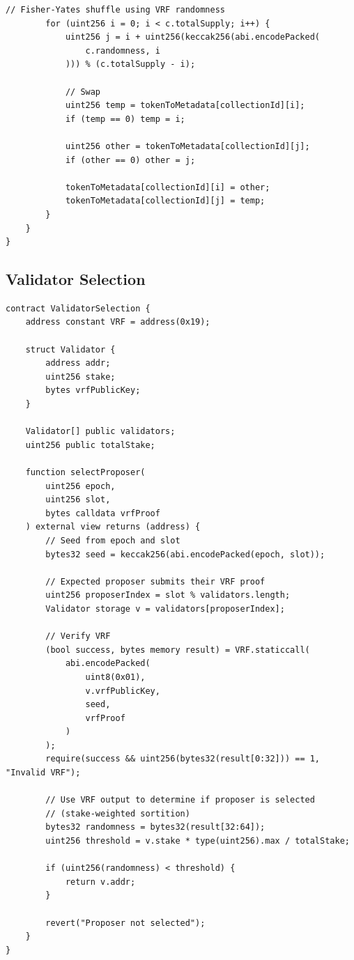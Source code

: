 \documentclass[11pt,a4paper]{article}
\theoremstyle{definition}
\begin{document}
\begin{lstlisting}[language=Solidity]
        // Fisher-Yates shuffle using VRF randomness
        for (uint256 i = 0; i < c.totalSupply; i++) {
            uint256 j = i + uint256(keccak256(abi.encodePacked(
                c.randomness, i
            ))) % (c.totalSupply - i);

            // Swap
            uint256 temp = tokenToMetadata[collectionId][i];
            if (temp == 0) temp = i;

            uint256 other = tokenToMetadata[collectionId][j];
            if (other == 0) other = j;

            tokenToMetadata[collectionId][i] = other;
            tokenToMetadata[collectionId][j] = temp;
        }
    }
}
\end{lstlisting}

\subsection{Validator Selection}

\begin{lstlisting}[language=Solidity]
contract ValidatorSelection {
    address constant VRF = address(0x19);

    struct Validator {
        address addr;
        uint256 stake;
        bytes vrfPublicKey;
    }

    Validator[] public validators;
    uint256 public totalStake;

    function selectProposer(
        uint256 epoch,
        uint256 slot,
        bytes calldata vrfProof
    ) external view returns (address) {
        // Seed from epoch and slot
        bytes32 seed = keccak256(abi.encodePacked(epoch, slot));

        // Expected proposer submits their VRF proof
        uint256 proposerIndex = slot % validators.length;
        Validator storage v = validators[proposerIndex];

        // Verify VRF
        (bool success, bytes memory result) = VRF.staticcall(
            abi.encodePacked(
                uint8(0x01),
                v.vrfPublicKey,
                seed,
                vrfProof
            )
        );
        require(success && uint256(bytes32(result[0:32])) == 1, "Invalid VRF");

        // Use VRF output to determine if proposer is selected
        // (stake-weighted sortition)
        bytes32 randomness = bytes32(result[32:64]);
        uint256 threshold = v.stake * type(uint256).max / totalStake;

        if (uint256(randomness) < threshold) {
            return v.addr;
        }

        revert("Proposer not selected");
    }
}
\end{lstlisting}
\end{document}

